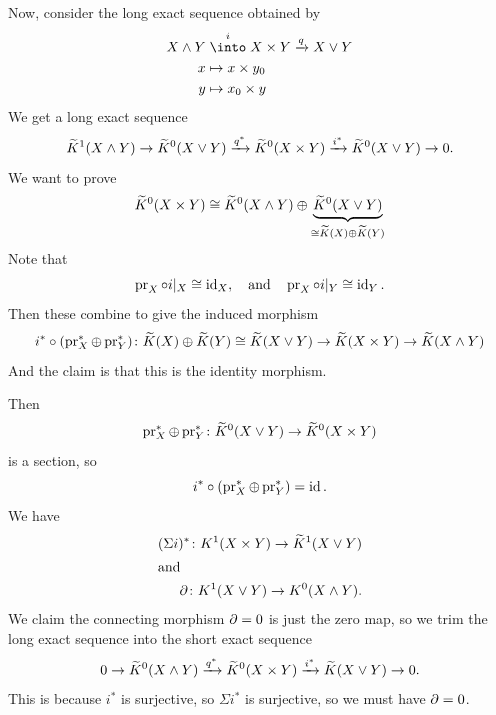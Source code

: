 \begin{node}
Now, consider the long exact sequence obtained by
\begin{equation}
\begin{split}
X\smashtimes Y & \stackrel{i}{\into} X\times
Y\xrightarrow{q}X\wedgetimes Y\\
x & \mapsto x\times y_{0}\\
y & \mapsto x_{0}\times y
\end{split}
\end{equation}
We get a long exact sequence
\begin{equation}
\widetilde{K}^{1}(X\mathbin{\wedge} Y)\to\widetilde{K}^{0}(X\mathbin{\vee}
Y)\xrightarrow{q^{*}}\widetilde{K}^{0}(X\times
Y)\xrightarrow{i^{*}}\widetilde{K}^{0}(X\mathbin{\vee} Y)\to0.
\end{equation}
We want to prove
\begin{equation}
\widetilde{K}^{0}(X\times Y)\cong\widetilde{K}^{0}(X\mathbin{\wedge}
Y)\oplus\underbrace{\widetilde{K}^{0}(X\mathbin{\vee} Y)}_{\cong\widetilde{K}(X)\oplus\widetilde{K}(Y)}
\end{equation}
Note that
\begin{equation}
\operatorname{pr}_{X}\circ i|_{X}\cong\operatorname{id}_{X},\quad\mbox{and}\quad
\operatorname{pr}_{X}\circ i|_{Y}\cong\operatorname{id}_{Y}.
\end{equation}
Then these combine to give the induced morphism
\begin{equation}
i^{*}\circ(\operatorname{pr}_{X}^{*}\oplus\operatorname{pr}_{Y}^{*})\colon
\widetilde{K}(X)\oplus\widetilde{K}(Y)\cong\widetilde{K}(X\mathbin{\vee} Y)\to
\widetilde{K}(X\times Y)\to\widetilde{K}(X\mathbin{\wedge} Y)
\end{equation}
And the claim is that this is the identity morphism.

Then
\begin{equation}
\operatorname{pr}_{X}^{*}\oplus\operatorname{pr}_{Y}^{*}\colon\widetilde{K}^{0}(X\mathbin{\vee} Y)\to\widetilde{K}^{0}(X\times Y)
\end{equation}
is a section, so
\begin{equation}
i^{*}\circ(\operatorname{pr}_{X}^{*}\oplus\operatorname{pr}_{Y}^{*})=\operatorname{id}.
\end{equation}
We have
\begin{subequations}
  \begin{align}
(\Sigma i)^{*}\colon K^{1}(X\times Y)\to\widetilde{K}^{1}(X\mathbin{\vee} Y)\\
    \intertext{and}
    \partial\colon K^{1}(X\mathbin{\vee} Y)\to K^{0}(X\mathbin{\wedge} Y).
  \end{align}
\end{subequations}
We claim the connecting morphism $\partial=0$ is just the zero map,
so we trim the long exact sequence into the short exact sequence
\begin{equation}
0\to\widetilde{K}^{0}(X\mathbin{\wedge}
Y)\xrightarrow{q^{*}}\widetilde{K}^{0}(X\times
Y)\xrightarrow{i^{*}}\widetilde{K}(X\mathbin{\vee} Y)\to0.
\end{equation}
This is because $i^{*}$ is surjective, so $\Sigma i^{*}$ is
surjective, so we must have $\partial=0$.
\end{node}


